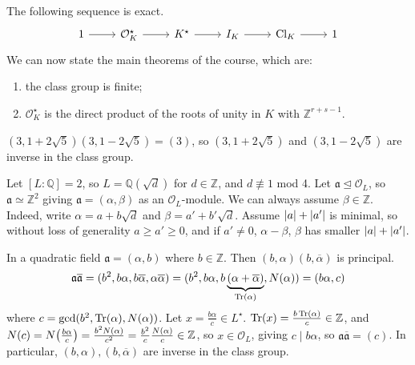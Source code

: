 The following sequence is exact.
\[\begin{tikzcd}
	1 & {\mathcal O_K^\star} & {K^\star} & {I_K} & {\mathrm{Cl}_K} & 1
	\arrow[from=1-1, to=1-2]
	\arrow[from=1-2, to=1-3]
	\arrow[from=1-3, to=1-4]
	\arrow[from=1-4, to=1-5]
	\arrow[from=1-5, to=1-6]
\end{tikzcd}\]
We can now state the main theorems of the course, which are:
\begin{enumerate}
    \item the class group is finite;
    \item \( \mathcal O_K^\star \) is the direct product of the roots of unity in \( K \) with \( \mathbb Z^{r+s-1} \).
\end{enumerate}
\begin{example}
    \( (3,1+2\sqrt{5})(3,1-2\sqrt{5}) = (3) \), so \( (3,1+2\sqrt{5}) \) and \( (3,1-2\sqrt{5}) \) are inverse in the class group.
\end{example}
\begin{example}
   Let  \( [L:\mathbb Q] = 2 \), so \( L = \mathbb Q(\sqrt{d}) \) for \( d \in \mathbb Z \), and \( d \not\equiv 1 \) mod 4.
   Let \( \mathfrak a \trianglelefteq \mathcal O_L \), so \( \mathfrak a \simeq \mathbb Z^2 \) giving \( \mathfrak a = (\alpha, \beta) \) as an \( \mathcal O_L \)-module.
   We can always assume \( \beta \in \mathbb Z \).
   Indeed, write \( \alpha = a + b \sqrt{d} \) and \( \beta = a' + b' \sqrt{d} \).
   Assume \( \abs{a} + \abs{a'} \) is minimal, so without loss of generality \( a \geq a' \geq 0 \), and if \( a' \neq 0 \), \( \alpha - \beta \), \( \beta \) has smaller \( \abs{a} + \abs{a'} \).
\end{example}
\begin{example}
    In a quadratic field \( \mathfrak a = (\alpha, b) \) where \( b \in \mathbb Z \).
    Then \( (b, \alpha) (b, \overline \alpha) \) is principal.
    \[ \mathfrak a \overline{\mathfrak a} = (b^2, b\alpha, b\overline \alpha, \alpha\overline\alpha) = (b^2, b\alpha, b\underbrace{(\alpha + \overline \alpha)}_{\Tr(\alpha)}, N(\alpha)) = (b\alpha, c) \]
    where \( c = \gcd(b^2, \Tr(\alpha), N(\alpha)) \).
    Let \( x = \frac{b\alpha}{c} \in L^\star \).
    \( \Tr(x) = \frac{b\Tr(\alpha)}{c} \in \mathbb Z \), and \( N(c) = N\qty(\frac{b\alpha}{c}) = \frac{b^2 N(\alpha)}{c^2} = \frac{b^2}{c} \frac{N(\alpha)}{c} \in \mathbb Z \), so \( x \in \mathcal O_L \), giving \( c \mid b\alpha \), so \( \mathfrak a \overline{\mathfrak a} = (c) \).
    In particular, \( (b, \alpha), (b, \overline \alpha) \) are inverse in the class group.
\end{example}

